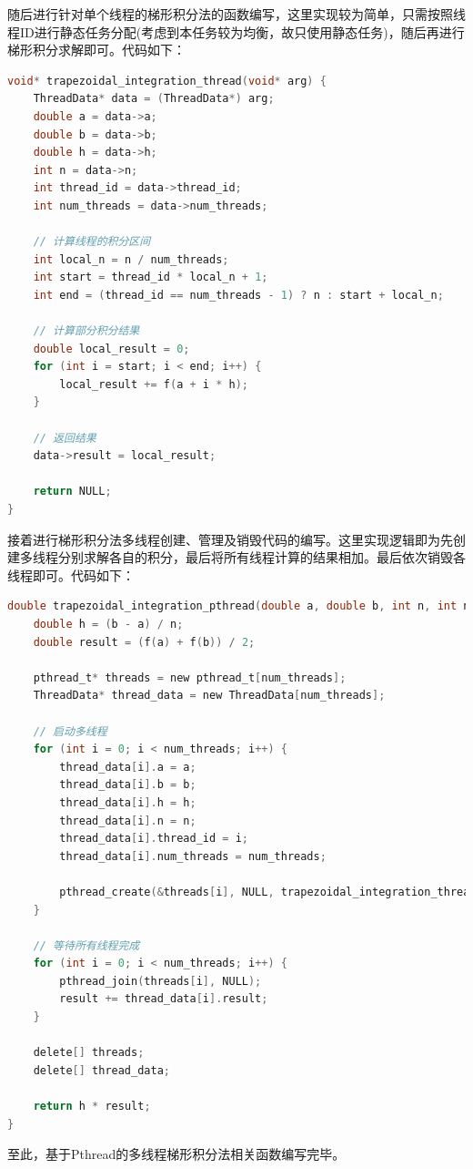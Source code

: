 \documentclass{nku}
\begin{document}
随后进行针对单个线程的梯形积分法的函数编写，这里实现较为简单，只需按照线程ID进行静态任务分配(考虑到本任务较为均衡，故只使用静态任务)，随后再进行梯形积分求解即可。代码如下：
\begin{lstlisting}[language=C]
void* trapezoidal_integration_thread(void* arg) {
    ThreadData* data = (ThreadData*) arg;
    double a = data->a;
    double b = data->b;
    double h = data->h;
    int n = data->n;
    int thread_id = data->thread_id;
    int num_threads = data->num_threads;

    // 计算线程的积分区间
    int local_n = n / num_threads;
    int start = thread_id * local_n + 1;
    int end = (thread_id == num_threads - 1) ? n : start + local_n;

    // 计算部分积分结果
    double local_result = 0;
    for (int i = start; i < end; i++) {
        local_result += f(a + i * h);
    }

    // 返回结果
    data->result = local_result;

    return NULL;
}
\end{lstlisting}

接着进行梯形积分法多线程创建、管理及销毁代码的编写。这里实现逻辑即为先创建多线程分别求解各自的积分，最后将所有线程计算的结果相加。最后依次销毁各线程即可。代码如下：
\begin{lstlisting}[language=C]
double trapezoidal_integration_pthread(double a, double b, int n, int num_threads) {
    double h = (b - a) / n;
    double result = (f(a) + f(b)) / 2;

    pthread_t* threads = new pthread_t[num_threads];
    ThreadData* thread_data = new ThreadData[num_threads];

    // 启动多线程
    for (int i = 0; i < num_threads; i++) {
        thread_data[i].a = a;
        thread_data[i].b = b;
        thread_data[i].h = h;
        thread_data[i].n = n;
        thread_data[i].thread_id = i;
        thread_data[i].num_threads = num_threads;

        pthread_create(&threads[i], NULL, trapezoidal_integration_thread, (void*)&thread_data[i]);
    }

    // 等待所有线程完成
    for (int i = 0; i < num_threads; i++) {
        pthread_join(threads[i], NULL);
        result += thread_data[i].result;
    }

    delete[] threads;
    delete[] thread_data;

    return h * result;
}
\end{lstlisting}

至此，基于Pthread的多线程梯形积分法相关函数编写完毕。
\end{document}

